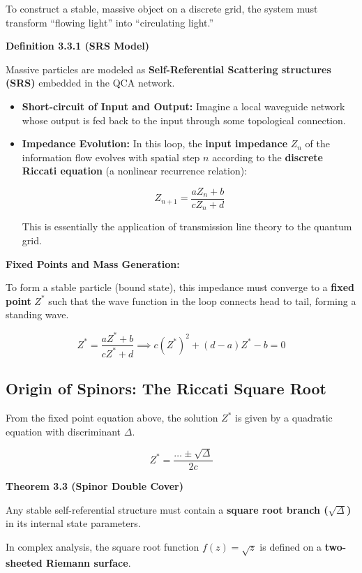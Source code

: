 To construct a stable, massive object on a discrete grid, the system must transform ``flowing light'' into ``circulating light.''

\textbf{Definition 3.3.1 (SRS Model)}

Massive particles are modeled as \textbf{Self-Referential Scattering structures (SRS)} embedded in the QCA network.

\begin{itemize}
\item \textbf{Short-circuit of Input and Output:} Imagine a local waveguide network whose output is fed back to the input through some topological connection.

\item \textbf{Impedance Evolution:} In this loop, the \textbf{input impedance} $Z_n$ of the information flow evolves with spatial step $n$ according to the \textbf{discrete Riccati equation} (a nonlinear recurrence relation):

    $$Z_{n+1} = \frac{a Z_n + b}{c Z_n + d}$$

    This is essentially the application of transmission line theory to the quantum grid.
\end{itemize}

\textbf{Fixed Points and Mass Generation:}

To form a stable particle (bound state), this impedance must converge to a \textbf{fixed point} $Z^*$ such that the wave function in the loop connects head to tail, forming a standing wave.

$$Z^* = \frac{a Z^* + b}{c Z^* + d} \implies c(Z^*)^2 + (d-a)Z^* - b = 0$$

\subsection{Origin of Spinors: The Riccati Square Root}

From the fixed point equation above, the solution $Z^*$ is given by a quadratic equation with discriminant $\Delta$.

$$Z^* = \frac{\dots \pm \sqrt{\Delta}}{2c}$$

\textbf{Theorem 3.3 (Spinor Double Cover)}

Any stable self-referential structure must contain a \textbf{square root branch ($\sqrt{\Delta}$)} in its internal state parameters.

In complex analysis, the square root function $f(z) = \sqrt{z}$ is defined on a \textbf{two-sheeted Riemann surface}.

